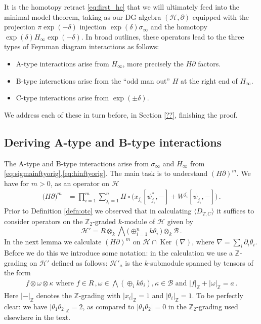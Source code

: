 \documentclass[english,letter paper,12pt,leqno]{article}
\theoremstyle{example}
\numberwithin{equation}{section}
\def\Ker{\operatorname{Ker}}
\def\be{\begin{equation}}
\def\ee{\end{equation}}
\def\nZ{\mathds{Z}}
\begin{document}
It is the homotopy retract \eqref{eq:first_he} that we will ultimately feed into the minimal model theorem, taking as our DG-algebra $(\mathscr{H}, \partial)$ equipped with the projection $\pi \exp(-\delta)$ injection $\exp(\delta) \sigma_\infty$ and the homotopy $\exp(\delta) H_\infty \exp(-\delta)$. In broad outlines, these operators lead to the three types of Feynman diagram interactions as follows:
\begin{itemize}
\item A-type interactions arise from $H_\infty$, more precisely the $H \partial$ factors.
\item B-type interactions arise from the ``odd man out'' $H$ at the right end of $H_\infty$.
\item C-type interactions arise from $\exp(\pm \delta)$.
\end{itemize}
We address each of these in turn before, in Section \ref{??}, finishing the proof.

\subsection{Deriving A-type and B-type interactions}

The A-type and B-type interactions arise from $\sigma_\infty$ and $H_\infty$ from \eqref{eq:sigmainftyorig},\eqref{eq:hinftyorig}. The main task is to understand $(H \partial)^m$. We have for $m > 0$, as an operator on $\mathscr{H}$
\begin{align*}
\big( H \partial )^m &= \prod_{i=1}^m \sum_{j_i = 1}^n H \circ \Big( x_{j_i} [\psi_{j_i}^*,-] + W^{j_i} [\psi_{j_i},-] \Big)\,.
\end{align*}
Prior to Definition \ref{defn:otc} we observed that in calculating $\langle D_{T,C} \rangle$ it suffices to consider operators on the $\nZ_2$-graded $k$-module of $\mathscr{H}$ given by
\be
\mathscr{H}' = R \otimes_k \bigwedge\big( \oplus_{i=1}^n k \theta_i \,\big) \otimes_k \mathscr{B}\,.
\ee
In the next lemma we calculate $(H \partial)^m$ on $\mathscr{H} \cap \Ker(\nabla)$, where $\nabla = \sum_i \partial_i \theta_i$. Before we do this we introduce some notation: in the calculation we use a $\nZ$-grading on $\mathscr{H}'$ defined as follows: $\mathscr{H}'_a$ is the $k$-submodule spanned by tensors of the form
\begin{align*}
f \otimes \omega \otimes \kappa \text{ where } f \in R\,, \omega \in \bigwedge( \oplus_i k \theta_i ), \kappa \in \mathscr{B} \text{ and } |f|_{\nZ} + |\omega|_{\nZ} = a\,.
\end{align*}
Here $|-|_{\nZ}$ denotes the $\nZ$-grading with $|x_i|_{\nZ} = 1$ and $|\theta_i|_{\nZ} = 1$. To be perfectly clear: we have $|\theta_1 \theta_2|_{\nZ} = 2$, as compared to $| \theta_1 \theta_2 | = 0$ in the $\nZ_2$-grading used elsewhere in the text.
\end{document}
